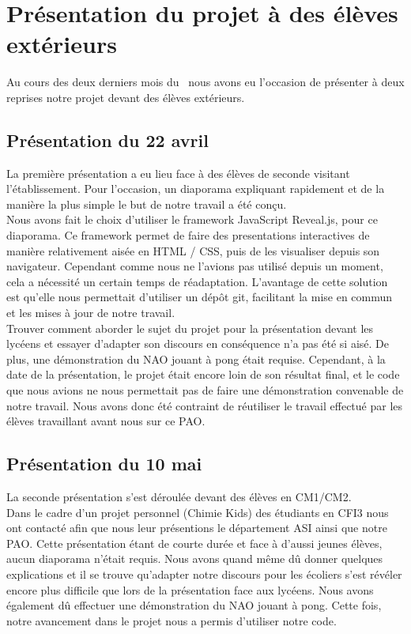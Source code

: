 \section{Présentation du projet à des élèves extérieurs}
\label{sec:Présentation du projet à des élèves extérieurs}
  \par Au cours des deux derniers mois du \pao\ nous avons eu l'occasion de présenter à deux reprises notre projet devant des élèves extérieurs.\\

  \subsection{Présentation du 22 avril}
  \label{sub:Présentation du 22 avril}
    \par La première présentation a eu lieu face à des élèves de seconde visitant l'établissement.
    Pour l'occasion, un diaporama expliquant rapidement et de la manière la plus simple le but de notre travail a été conçu.\\
    Nous avons fait le choix d'utiliser le framework JavaScript Reveal.js, pour ce diaporama. 
    Ce framework permet de faire des presentations interactives de manière relativement aisée en HTML / CSS, puis de les visualiser depuis son navigateur. Cependant comme nous ne l’avions pas utilisé depuis un moment, cela a nécessité un certain temps de réadaptation.
    L'avantage de cette solution est qu'elle nous permettait d'utiliser un dépôt git, facilitant la mise en commun et les mises à jour de notre travail.\\
    Trouver comment aborder le sujet du projet pour la présentation devant les lycéens et essayer d’adapter son discours en conséquence n’a pas été si aisé.
    De plus, une démonstration du NAO jouant à pong était requise.
    Cependant, à la date de la présentation, le projet était encore loin de son résultat final, et le code que nous avions ne nous permettait pas de faire une démonstration convenable de notre travail.
    Nous avons donc été contraint de réutiliser le travail effectué par les élèves travaillant avant nous sur ce PAO.\\

  \subsection{Présentation du 10 mai}
  \label{sub:Présentation du 10 mai}
    \par La seconde présentation s'est déroulée devant des élèves en CM1/CM2. \\
    Dans le cadre d'un projet personnel (Chimie Kids) des étudiants en CFI3 nous ont contacté afin que nous leur présentions le département ASI ainsi que notre PAO.
    Cette présentation étant de courte durée et face à d'aussi jeunes élèves, aucun diaporama n'était requis. Nous avons quand même dû donner quelques explications et il se trouve qu'adapter notre discours pour les écoliers s'est révéler encore plus difficile que lors de la présentation face aux lycéens.
    Nous avons également dû effectuer une démonstration du NAO jouant à pong.
    Cette fois, notre avancement dans le projet nous a permis d'utiliser notre code.
\pagebreak

